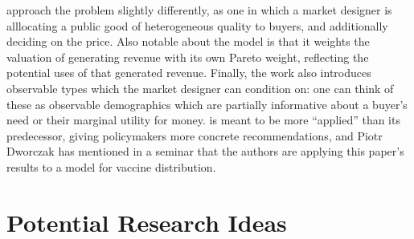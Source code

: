 \documentclass[AER]{AEA}
\begin{document}

\cite{akbarpour-2020} approach the problem slightly differently, as one in which a market designer is alllocating a public good of heterogeneous quality to buyers, and additionally deciding on the price. Also notable about the \cite{akbarpour-2020} model is that it weights the valuation of generating revenue with its own Pareto weight, reflecting the potential uses of that generated revenue. Finally, the work also introduces observable types which the market designer can condition on: one can think of these as observable demographics which are partially informative about a buyer's need or their marginal utility for money. \cite{akbarpour-2020} is meant to be more ``applied'' than its predecessor, giving policymakers more concrete recommendations, and Piotr Dworczak has mentioned in a seminar that the authors are applying this paper's results to a model for vaccine distribution.

\section{Potential Research Ideas}
\label{sec:ideas}
\end{document}
